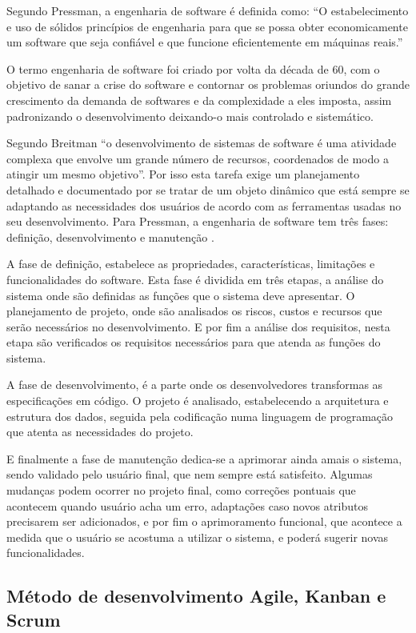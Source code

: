 \documentclass[
	article,			%
	11pt,				%
	oneside,			%
	a4paper,			%
	english,			%
	brazil,				%
	sumario=tradicional
	]{abntex2}
\begin{document}
Segundo Pressman, a engenharia de software é definida como: “O estabelecimento e uso de sólidos princípios de engenharia para que se possa obter economicamente um software que seja confiável e que funcione eficientemente em máquinas reais.”\cite{pressman}

O termo engenharia de software foi criado por volta da década de 60, com o objetivo de sanar a crise do software e contornar os problemas oriundos do grande crescimento da demanda de softwares e da complexidade a eles imposta, assim padronizando o desenvolvimento deixando-o mais controlado e sistemático.

Segundo Breitman “o desenvolvimento de sistemas de software é uma atividade complexa que envolve um grande número de recursos, coordenados de modo a atingir um mesmo objetivo”. \cite{breitman}
Por isso esta tarefa exige um planejamento detalhado e documentado por se tratar de um objeto dinâmico que está sempre se adaptando as necessidades dos usuários de acordo com as ferramentas usadas no seu desenvolvimento.
Para Pressman, a engenharia de software tem três fases: definição, desenvolvimento e manutenção \cite{pressman}.

A fase de definição, estabelece as propriedades, características, limitações e funcionalidades do software.
Esta fase é dividida em três etapas, a análise do sistema onde são definidas as funções que o sistema deve apresentar.
O planejamento de projeto, onde  são analisados os riscos, custos e recursos que serão necessários no desenvolvimento.
E por fim a análise dos requisitos, nesta etapa são verificados os requisitos necessários para que atenda as funções do sistema.

A fase de desenvolvimento, é a parte onde os desenvolvedores transformas as especificações em código.
O projeto é analisado, estabelecendo a arquitetura e estrutura dos dados, seguida pela codificação numa linguagem de programação que atenta as necessidades do projeto.

E finalmente a fase de manutenção dedica-se a aprimorar ainda amais o sistema, sendo validado pelo usuário final, que nem sempre está satisfeito.
Algumas mudanças podem ocorrer no projeto final, como correções pontuais que acontecem quando usuário acha um erro, adaptações caso novos atributos precisarem ser adicionados, e por fim o aprimoramento funcional, que acontece a medida que o usuário se acostuma a utilizar o sistema, e poderá sugerir novas funcionalidades.

\subsection{Método de desenvolvimento Agile, Kanban e Scrum}
\end{document}
